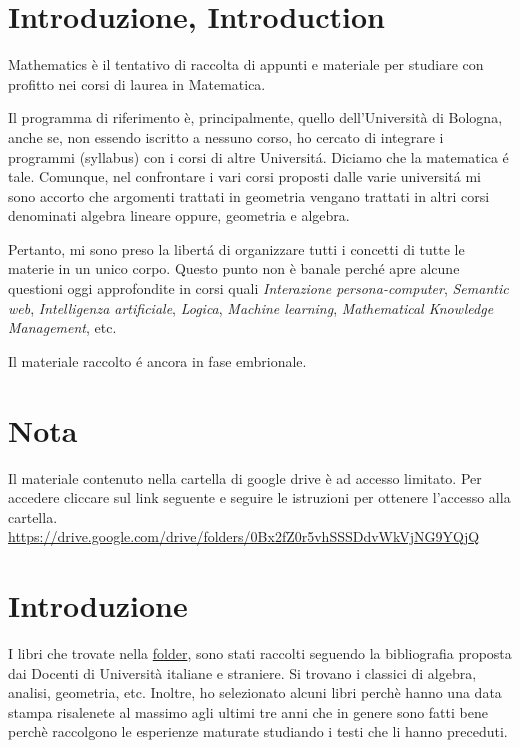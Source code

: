 \section{Introduzione, Introduction}		
Mathematics è il tentativo di raccolta di appunti e materiale per studiare con profitto nei corsi di laurea in Matematica.

Il programma di riferimento \`{e}, principalmente, quello dell'Universit\`{a}
di Bologna, anche se, non essendo iscritto a nessuno corso, ho cercato di integrare i programmi (syllabus) con i corsi di altre Universit\'{a}. Diciamo che la matematica \'{e} tale.
Comunque, nel confrontare i vari corsi proposti dalle varie universit\'{a} mi sono accorto che argomenti trattati in geometria vengano trattati in altri corsi denominati algebra lineare oppure, geometria e algebra.

Pertanto, mi sono preso la libert\'{a} di organizzare tutti i concetti di tutte le materie in un unico corpo. Questo punto non \`{e} banale perch\'{e} apre alcune questioni oggi
approfondite in corsi quali \textit{Interazione persona-computer}, \textit{Semantic web}, \textit{Intelligenza artificiale}, \textit{Logica}, \textit{Machine learning}, \textit{Mathematical Knowledge Management}, etc.

Il materiale raccolto \'{e} ancora in fase embrionale. 


\section*{Nota}
Il materiale contenuto nella cartella di google drive è ad accesso limitato. Per accedere cliccare sul link seguente e seguire le istruzioni per ottenere
l'accesso alla cartella. \url{https://drive.google.com/drive/folders/0Bx2fZ0r5vhSSSDdvWkVjNG9YQjQ}

\section*{Introduzione}
I libri che trovate nella \href{https://drive.google.com/drive/folders/0Bx2fZ0r5vhSSSDdvWkVjNG9YQjQ}{folder}, sono stati raccolti seguendo la bibliografia proposta dai Docenti di Università
italiane e straniere. Si trovano i classici di algebra, analisi, geometria, etc. Inoltre, ho selezionato alcuni libri perchè hanno una data stampa risalenete al massimo
agli ultimi tre anni che in genere sono fatti bene perchè raccolgono le esperienze maturate studiando i testi che li hanno preceduti.

